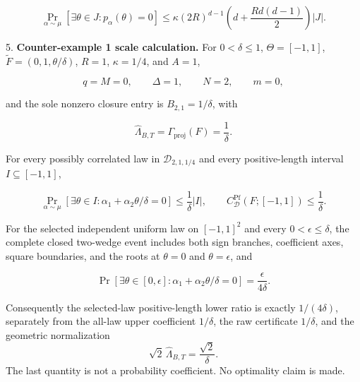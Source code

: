 \begin{proposition}
\begin{equation}
\label{eq:appendix-indented-055}
   \Pr_{\alpha\sim\mu}[\exists\theta\in J:p_\alpha(\theta)=0]
   \leq
   \kappa(2R)^{d-1}
   \left(d+\frac{Rd(d-1)}2\right)\lvert J\rvert.
\end{equation}

5. \textbf{Counter-example 1 scale calculation.} For \(0<\delta\leq1\),
   \(\Theta=[-1,1]\), \(\widetilde F=(0,1,\theta/\delta)\), \(R=1\), \(\kappa=1/4\), and \(A=1\),
   
\begin{equation}
\label{eq:appendix-indented-056}
   q=M=0,
   \qquad \Delta=1,
   \qquad N=2,
   \qquad m=0,
\end{equation}
   
   and the sole nonzero closure entry is \(B_{2,1}=1/\delta\), with
   
\begin{equation}
\label{eq:appendix-indented-057}
   \widehat\Lambda_{B,T}
   =\Gamma_{\mathrm{proj}}(F)
   =\frac1\delta.
\end{equation}
   
   For every possibly correlated law in \(\mathcal D_{2,1,1/4}\) and every positive-length interval
   \(I\subseteq[-1,1]\),
   
\begin{equation}
\label{eq:appendix-indented-058}
   \Pr_{\alpha\sim\mu}[\exists\theta\in I:
   \alpha_1+\alpha_2\theta/\delta=0]
   \leq\frac1\delta\lvert I\rvert,
   \qquad
   C^{\mathrm{Pf}}_{\mathcal D}(F;[-1,1])\leq\frac1\delta.
\end{equation}
   
   For the selected independent uniform law on \([-1,1]^2\) and every
   \(0<\epsilon\leq\delta\), the complete closed two-wedge event includes both sign branches, coefficient
   axes, square boundaries, and the roots at \(\theta=0\) and \(\theta=\epsilon\), and
   
\begin{equation}
\label{eq:appendix-indented-059}
   \Pr[\exists\theta\in[0,\epsilon]:
   \alpha_1+\alpha_2\theta/\delta=0]
   =\frac{\epsilon}{4\delta}.
\end{equation}
   
   Consequently the selected-law positive-length lower ratio is exactly \(1/(4\delta)\), separately from the
   all-law upper coefficient \(1/\delta\), the raw certificate \(1/\delta\), and the geometric normalization
\begin{equation}
\label{eq:appendix-indented-060}
   \sqrt2\,\widehat\Lambda_{B,T}=\frac{\sqrt2}{\delta}.
\end{equation}
   The last quantity is not a probability coefficient. No optimality claim is made.


\end{proposition}
